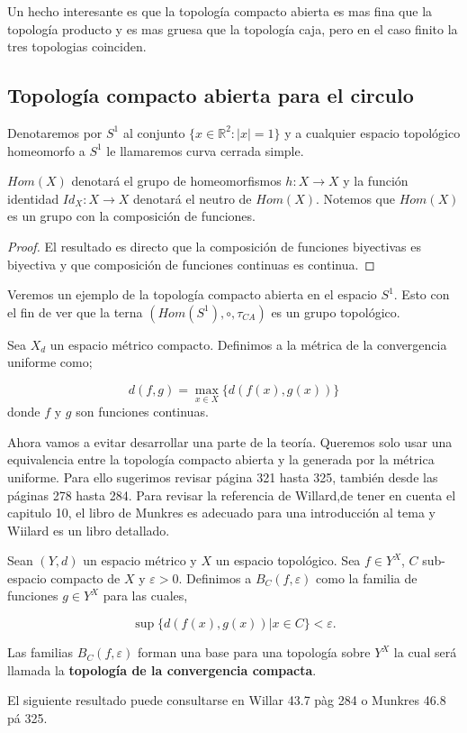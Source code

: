\begin{ob}
Un hecho interesante es que la topología compacto abierta es mas fina que la topología producto y es mas gruesa que la topología caja, pero en el caso finito la tres topologias coinciden.
\end{ob}


\subsection*{Topología compacto abierta para el circulo}

Denotaremos por $S^1$ al conjunto $\{x \in\mathbb{R}^2:|x|=1 \}$ y a cualquier espacio topológico homeomorfo a $S^1$ le llamaremos curva cerrada simple.


	\begin{nt} $Hom(X)$ denotará el grupo de homeomorfismos $h:X \to X$ y la función identidad $Id_X:X \to X$ denotará el neutro de $Hom(X)$. Notemos que $Hom(X)$ es un grupo con la composición de funciones.
	\end{nt}
	
		\begin{proof}
	El resultado es directo que la composición de funciones biyectivas es biyectiva y que composición de funciones continuas es continua. 
	\end{proof}
	

 Veremos un ejemplo de la topología compacto abierta en el espacio $S^1$. Esto con el fin de ver que la terna $(Hom(S^1),\circ, \tau_{CA})$ es un grupo topológico. 


\begin{df}
Sea $X_d$ un espacio métrico compacto. Definimos a la métrica de la convergencia uniforme como;

$$d(f,g)= \max_{x \in X}\{d(f(x),g(x)) \}$$
donde $f$ y $g$ son funciones continuas. 
\end{df}


Ahora vamos a evitar desarrollar una parte de la teoría. Queremos solo usar una equivalencia entre la topología compacto abierta y la generada por la métrica uniforme. Para ello sugerimos revisar \cite{top_munk} página 321 hasta 325, también \cite{top_willd} desde las páginas 278 hasta 284. Para revisar la referencia de Willard,de tener en cuenta el capitulo 10, el libro de Munkres es adecuado para una introducción al tema y Wiilard es un libro detallado.

\begin{df}
Sean $(Y,d)$ un espacio métrico y $X$ un espacio topológico. Sea $f \in Y^X$, $C$ sub-espacio compacto de $X$ y $\varepsilon > 0$. Definimos a $B_C(f, \varepsilon)$ como la familia de funciones $g \in Y ^X$ para las cuales,

$$\sup \{d(f(x),g(x))|x \in C \} < \varepsilon.$$

Las familias  $B_C(f,\varepsilon)$ forman una base para una topología sobre $Y^X$ la cual será llamada la \textbf{topología de la convergencia compacta}.  
\end{df}
El siguiente resultado puede consultarse en Willar 43.7 pàg 284 o Munkres 46.8 pá 325.

